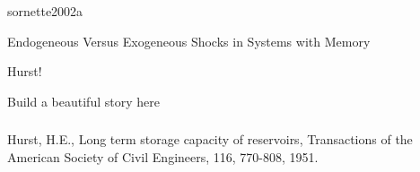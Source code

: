 sornette2002a

Endogeneous Versus Exogeneous Shocks in Systems with Memory

Hurst!
\cite{hurst1951a}

Build a beautiful story here

\begin{frame}
  \frametitle{}

  
\end{frame}

Hurst, H.E., Long term storage capacity of reservoirs, Transactions of the American Society of Civil Engineers, 116, 770-808, 1951.
